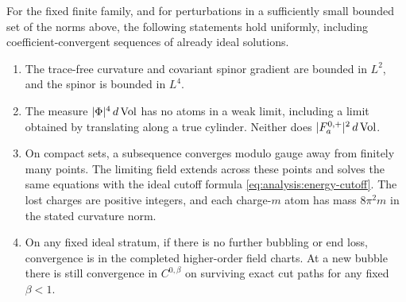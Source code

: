 \begin{lemma}
\label{lem:analysis:compactness}
For the fixed finite family, and for perturbations in a sufficiently
small bounded set of the norms above, the following statements hold
uniformly, including coefficient-convergent sequences of already ideal
solutions.
\begin{enumerate}
\item The trace-free curvature and covariant spinor gradient are bounded
in $L^2$, and the spinor is bounded in $L^4$.
\item The measure $|\Phi|^4\,d\operatorname{Vol}$ has no atoms in a weak limit,
including a limit obtained by translating along a true cylinder.
Neither does $|F_a^{0,+}|^2\,d\operatorname{Vol}$.
\item On compact sets, a subsequence converges modulo gauge away from
finitely many points.  The limiting field extends across these points
and solves the same equations with the ideal cutoff formula
\eqref{eq:analysis:energy-cutoff}.  The lost charges are positive
integers, and each charge-$m$ atom has mass $8\pi^2m$ in the stated
curvature norm.
\item On any fixed ideal stratum, if there is no further bubbling or
end loss, convergence is in the completed higher-order field charts.
At a new bubble there is still convergence in $C^{0,\beta}$ on surviving
exact cut paths for any fixed $\beta<1$.
\end{enumerate}
\end{lemma}
